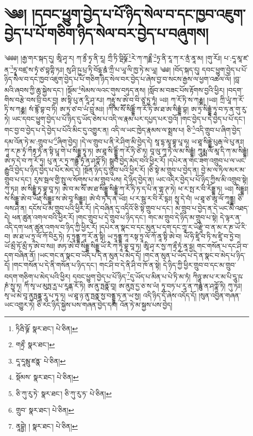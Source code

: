 \setcounter{footnote}{0} 
\chapter{༄༅། །དབང་ཕྱུག་བྱེད་པ་པོ་ཉིད་སེལ་བ་དང་ཁྱབ་འཇུག་བྱེད་པ་པོ་གཅིག་ཉིད་སེལ་བར་བྱེད་པ་བཞུགས། }༄༅༅། །རྒྱ་གར་སྐད་དུ། ཨཱི་ཤྭ་ར། ཀ་རྷྲྀ་ཏྭ་ནི་རཱ། ཀྲྀ་ཏི་བྡིཥྞོ་\footnote{ཏིརྦི་ཥྞོ་  སྣར་ཐང་།  པེ་ཅིན། }རེ་ཀ་ཀརྷྲྶྀ་\footnote{གརྟྲྀ་  སྣར་ཐང་། }ཏྭ་ནི་རཱ་ཀ་ར་ནྲཾ་ནཱ་མ། །གུ་རོཿ། པ་:དཱ་མཱ་ཛ་ན་\footnote{དཱ་དཱམྦུ་ཛནྣ་  པེ་ཅིན། }ཏྭཱ་བཛྲ་ས་ཏྭཾ་ཙ་བྟཀྟི་ཏཿ། སུ་ཤི་ཥྱ་པྲ་ཏི་བོདྷཱ་རྛཾ་ཀྲྀ་པ་ཡཱ་ལི་ཁྱ་ཏེ་མ་ཡཱ། ༄༅། །བོད་སྐད་དུ། དབང་ཕྱུག་བྱེད་པ་པོ་ཉིད་སེལ་བ་དང་ཁྱབ་འཇུག་བྱེད་པ་པོ་གཅིག་ཉིད་སེལ་བར་བྱེད་པ་ཞེས་བྱ་བ་སངས་རྒྱས་ལ་ཕྱག་འཚལ་ལོ། །བླ་མའི་ཞབས་ཀྱི་ཆུ་སྐྱེས་དང་། །སྡོམ་\footnote{སྡོམས་  སྣར་ཐང་།  པེ་ཅིན། }སེམས་ལའང་གུས་བཏུད་ནས། །སློབ་མ་བཟང་པོས་རྟོགས་བྱའི་ཕྱིར། །བདག་གིས་བརྩེ་བས་བྲི་བར་བྱ། ཨ་སྟི་པུ་ན་རཱི་ཤྭ་རཿ། ཀརྟྱཱ་ས་ཨེ་བ་བི་ཙཱ་ཏྱ་ཏཱཾ། ཡཿ། ཀ་རོ་ཏི་ས་ཀརྞྞ། །ཡཿ། ཀྲི་ཡཱཾ་ཀ་རོ་ཏི་ས་ཀརྞྞ། སཾ་ཛྙོ་བྷ་བ་ཏི། ཨ་ཏྲ་ཙ་བ་ཡཾ་བྲུ་མཿ། །ཀི་མ་སཽ་སིདྡྷིཾ་ཀ་རོ་ཏི་ཨ་ཐ་ཨ་སིདྡྷཾ་བྷ། ཨ་ཏྲ་སིདྡྷཾ་ཏཱ་བ་ཏ་ན་གུ་རུ་ཏེ། ཡང་དབང་ཕྱུག་བྱེད་པ་པོ་ཉིད་དུ་ཡོད་ཅེས་པ་འདི་ལ་རྣམ་པར་དཔྱད་པར་བྱའོ། །གང་བྱེད་པ་དེ་བྱེད་པ་པོ་དང་། གང་བྱ་བ་བྱེད་པ་དེ་བྱེད་པ་པོའི་མིང་དུ་འགྱུར་ན། འདི་ལ་ཡང་ཁྱེད་རྣམས་ལ་སྨྲས་པ། ཅི་\footnote{ཅི་ཀུ་རུ་ཏེ་  སྣར་ཐང་། ཅི་ཀུ་རུ་ཏ་  པེ་ཅིན། }འདི་གྲུབ་པ་ཞིག་བྱེད་དམ་འོན་ཏེ་མ་:གྲུབ་པ་\footnote{གྲུབ་  སྣར་ཐང་།  པེ་ཅིན། }ཞིག་བྱེད། །དེ་ལ་གྲུབ་པ་ནི་རེ་ཤིག་མི་བྱེད་དེ། སཱ་དྷ་མཱ་བྷཱ་པཱ་ཧ། ཡ་ཐཱ་སིདྡྷེ་པུརྒ་ལེ་པུ་ནཿ། ཀཱ་ར་ཎ་ཏྭཾ་ཀྀརྟྭ་ཏྭཾ་ན་སྟི་པྲཱ་གེ་པ་སིདྡྷ་ཏྭཱ་ཏ། ཨ་ཐཱ་སི་དྡྷཱིཾ་ཀ་རོ་ཏི་ཙེ་ཏ། བཱ་ལུ་ཀཱ་ཏཻ་ལ་མ་སིདྡྷཾ། ཀཱུརྨྨ་ལོ་མཱ་དི་ཀ་མ་སིདྡྷཾ། ཨེ་ཏ་དེ་བ་ཀ་རོ་ཏུ། པུ་ན་ར་ཏྲ་ཀརྟྟྲྀ་ཏྭཾ་ན་ཤཀྣོ་ཏི། སྒྲུབ་བྱེད་མེད་བའི་ཕྱིར་རོ། །དཔེར་ན་གང་ཟག་འགྲུབ་པ་ལ་ཡང་རྒྱུའི་བྱེད་པ་ཉིད་བྱེད་པ་པོར་མེད་དེ། །སྔོན་ཉིད་དུ་གྲུབ་པའི་ཕྱིར་རོ། །ཅི་སྟེ་མ་གྲུབ་པ་བྱེད་ན། བྱེ་མ་ལ་ཏིལ་མར་མ་གྲུབ་པ་དང་། རུས་སྦལ་གྱི་སྤུ་ལ་སོགས་པ་མ་གྲུབ་པས། དེ་ཉིད་བྱེད་ན། ཡང་འདིར་བྱེད་པ་པོ་ཉིད་ཀྱིས་མི་འགྲུབ་སྟེ། ཀུ་ཏཿ། ཨ་སིདྡྷཾ་ཏྭ་བྷཱ་བཱ་ཏ། ཨེ་བ་མ་སཽ་ཨ་ཐ་སིདྡྷཱ་སིདྡྷཾ་ཀ་རོ་ཏི་ཏ་ད་པི་ན་གྷ་ཊ་ཏེ། ཕ་ར་སྤ་ར་བི་རོཏྡྷ་ཏ། ཡཿ། སིདྡྷཿ། ས་སིདྡྷ་ཨེ་བ་ཡོརྡ་སིདྡྷཿ་ས་ཨེ་བཱ་སིདྡྷཿ། ཨེ་བཾ་ཏ་ད་ན་ཡོཿ། པ་ར་སྦུ་ར་བི་རོ་དྷཿ། སྱཱ་དེ་བཾ། ཡ་ཐཱ་ཙ་ཨཱ་ལོ་ཀཱནྡྷ། ཅི་ལས་ཤེ་ན། དངོས་པོ་མ་གྲུབ་པའི་ཕྱིར་རོ། །དེ་བཞིན་དུ་འདིའོ་ཅི་སྟེ་གྲུབ་པ་དང་། མ་གྲུབ་པ་བྱེད་ན་དེ་ཡང་མི་འཐད་དེ། ཕན་ཚུན་འགལ་བའི་ཕྱིར་རོ། །གང་གྲུབ་པ་དེ་གྲུབ་པ་ཉིད་དང་། གང་མ་གྲུབ་དེ་ཉིད་མ་གྲུབ་པ་སྟེ། དེ་ལྟར་ན་འདི་དག་ཕན་ཚུན་འགལ་བ་ཉིད་ཀྱི་ཕྱིར་རོ། །དཔེར་ན་སྣང་བ་དང་མུན་པ་དག་དང་ཀྲཱ་ར་ཡོརྫཱི་བ་ན་མ་ར་ཎ་ཡོ་རི་བ། ཨ་ཐ་ཡ་ཏྲཱ་ལོ་ཀོ་བིརྱ་ཏེ། ཏ་ཏྲཱནྡྷ་ཀཱ་རོ་ནཱ་སྟི། ཡ་ཏྲཱནྡྷ་ཀཱ་རསྟ་ཏྲཱ་ལོ་ཀོ་ནཱ་སྟི་ཨེ་བ། ཡོ་ཧི་ཛཱི་བ་ཏི་ས་ཛཱི་བ་ཏྱེ་བ། ཡོ་མྲྀ་ཏོ་མྲྀ་ཏ་ཨེ་བ་སཿ། ཨཏ་ཨེ་བ་སིདྡྷ་སིདྡྷ་ཡོ་རཻ་ཀ་ཏཱ་བྷཱ་བཱ་ཏ། ཨཱི་ཤྭ་ར་སྱ་ཀ་རྟྲྀ་ཏྭཾ་ནཱ་དྡྱ། གང་གསོན་པ་དང་ཤི་བ་དག་བཞིན་ནོ། །ཡང་གང་ན་སྣང་བ་ཡོད་པ་དེ་ན་མུན་པ་མེད་དོ། །གང་ན་མུན་པ་ཡོད་པ་དེ་ན་སྣང་བ་མེད་པ་ཉིད་དོ། །གང་གསོན་པ་དེ་ནི་གསོན་པ་ཉིད་དང་། གང་ཤི་བ་དེ་ནི་ཤི་བ་ཁོ་ན་སྟེ། དེ་ཉིད་ཀྱི་ཕྱིར་གྲུབ་བ་དང་མ་གྲུབ་བདག་གཅིག་པ་མེད་པའི་ཕྱིར། དབང་ཕྱུག་བྱེད་པ་པོ་ཉིད་\footnote{ནཱབྷྱེ། །  སྣར་ཐང་།  པེ་ཅིན། }དུ་ཡོད་པ་མིན་པ་པེ་ཏི་མ་ཏཾ། ཀིཉྩ་ཨ་པ་ར་མ་པི་དཱུ་ཥ་ཎཾ་སྱཱ་ཏ། ཀིཾ་སྭ་ཡ་མུཏྤ་ཪྻ་པ་རཱནྐ་རོ་ཏི། ཨ་ནུ་ཏྤནྣོ་བཱ། ཨ་ནུཏྤ་དྱ་ཅ་ས་ཡཾ། ཏཱ་བཏ་པ་རཱ་ན་ཀརྟྟུཾ་ན་ཤཀྣོ་ཏི། ཀུ་ཏཿ། སྭ་ཡ་མེ་བཱ་ནུཏྤནྣཱ་རཱུ་པ་ཏཱ་ཏ། ཡ་ཐཱ་ཉ་ནུ་ཏྤནྣ་སྱ་བནྡྷཱ་ཏ་ན་ཡ་སྱ། འདི་ཉིད་དོ་ཞེས་འདོད་དོ། །སུན་འབྱིན་གཞན་ཡང་འགྱུར་ཏེ། ཅི་རང་ཉིད་སྐྱེས་པས་གཞན་བྱེད་དམ། འོན་ཏེ་མ་སྐྱས་པས་བྱེད། 